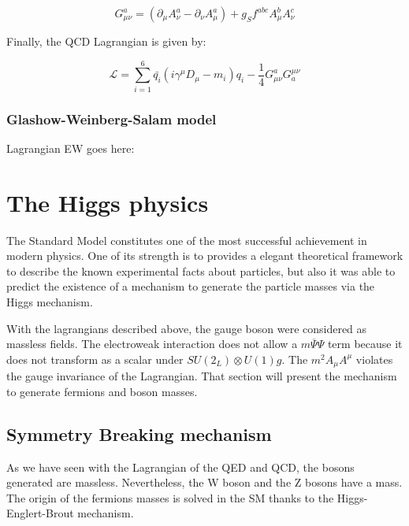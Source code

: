     \begin{equation}
      G^a_{\mu \nu} = \left( \partial_{\mu} A^a_{\nu} - \partial_{\nu} A^a_{\mu} \right) + g_S f^{abc} A^b_{\mu} A^c_{\nu}
    \end{equation} 

    Finally, the QCD Lagrangian is given by:

    \begin{equation}
      \mathcal{L} = \sum_{i=1}^6  \bar{q_i} \left(i \gamma^{\mu}D_{\mu} -m_i \right)q_i - \frac{1}{4} G_{\mu \nu}^{a} G_{a}^{\mu \nu}
    \end{equation}
    
    \subsubsection{Glashow-Weinberg-Salam model}
  
    Lagrangian EW goes here: 

  \section{The Higgs physics}

    The Standard Model constitutes one of the most successful achievement in modern physics.
    One of its strength is to provides a elegant theoretical framework to describe the known experimental facts about particles, but also it was able to predict 
    the existence of a mechanism to generate the particle masses via the Higgs mechanism.

    With the lagrangians described above, the gauge boson were considered as massless fields.
    The electroweak interaction does not allow a $m\overline{\Psi}\Psi$ term because it does not transform as a scalar under $SU(2_L)\otimes U(1)g$.
    The $m^2A_{\mu} A^{\mu}$ violates the gauge invariance of the Lagrangian.
    That section will present the mechanism to generate fermions and boson masses.

    \subsection{Symmetry Breaking mechanism}
    
    As we have seen with the Lagrangian of the QED and QCD, the bosons generated are massless. Nevertheless, the W boson and the Z bosons have a mass. 
    The origin of the fermions masses is solved in the SM thanks to the Higgs-Englert-Brout mechanism.

